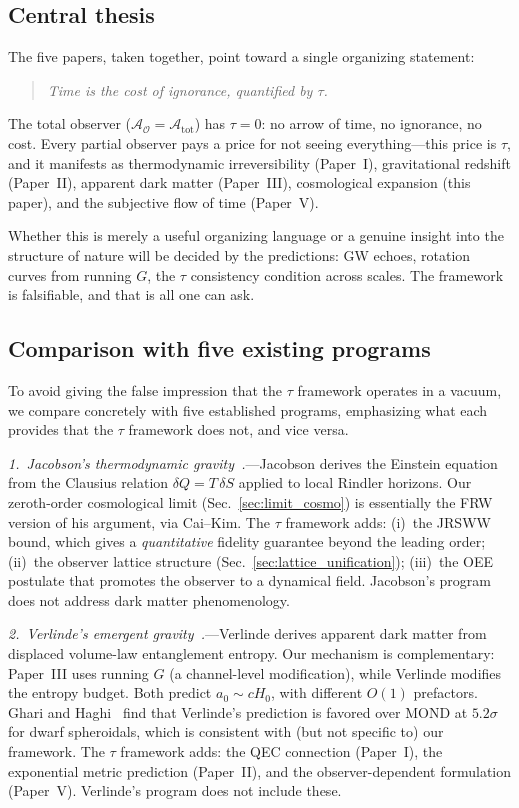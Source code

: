\documentclass[prd,twocolumn,superscriptaddress,longbibliography,floatfix]{revtex4-2}
\newcommand{\tauasym}{\tau}
\newcommand{\Aobs}{\mathcal{A}_{\mathcal{O}}}
\newcommand{\Atot}{\mathcal{A}_{\mathrm{tot}}}
\begin{document}
\subsection{Central thesis}

The five papers, taken together, point toward a single
organizing statement:
\begin{quote}
\emph{Time is the cost of ignorance, quantified by
$\tauasym$.}
\end{quote}
The total observer ($\Aobs = \Atot$) has $\tauasym = 0$:
no arrow of time, no ignorance, no cost.
Every partial observer pays a price for not seeing
everything---this price is $\tauasym$, and it manifests
as thermodynamic irreversibility (Paper~I), gravitational
redshift (Paper~II), apparent dark matter (Paper~III),
cosmological expansion (this paper), and the subjective
flow of time (Paper~V).

Whether this is merely a useful organizing language or a
genuine insight into the structure of nature will be
decided by the predictions: GW echoes, rotation curves
from running $G$, the $\tauasym$ consistency condition
across scales.  The framework is falsifiable, and
that is all one can ask.


\subsection{Comparison with five existing programs}

To avoid giving the false impression that the
$\tauasym$ framework operates in a vacuum, we
compare concretely with five established programs,
emphasizing what each provides that the $\tauasym$
framework does not, and vice versa.

\emph{1.\ Jacobson's thermodynamic
gravity~\cite{Jacobson1995,Jacobson2016}.}---Jacobson
derives the Einstein equation from the Clausius
relation $\delta Q = T\,\delta S$ applied to local
Rindler horizons.  Our zeroth-order cosmological
limit (Sec.~\ref{sec:limit_cosmo}) is essentially
the FRW version of his argument, via Cai--Kim.
The $\tauasym$ framework adds: (i)~the JRSWW bound,
which gives a \emph{quantitative} fidelity guarantee
beyond the leading order; (ii)~the observer lattice
structure (Sec.~\ref{sec:lattice_unification});
(iii)~the OEE postulate that promotes the observer
to a dynamical field.  Jacobson's program does not
address dark matter phenomenology.

\emph{2.\ Verlinde's emergent
gravity~\cite{Verlinde2016}.}---Verlinde derives
apparent dark matter from displaced volume-law
entanglement entropy.  Our mechanism is complementary:
Paper~III uses running $G$ (a channel-level modification),
while Verlinde modifies the entropy budget.  Both
predict $a_0 \sim cH_0$, with different $O(1)$
prefactors.  Ghari and Haghi~\cite{GhariHaghi2026}
find that Verlinde's prediction is favored over
MOND at $5.2\sigma$ for dwarf spheroidals, which
is consistent with (but not specific to) our framework.
The $\tauasym$ framework adds: the QEC connection
(Paper~I), the exponential metric prediction
(Paper~II), and the observer-dependent formulation
(Paper~V).  Verlinde's program does not include these.
\end{document}
